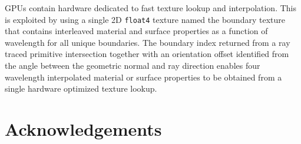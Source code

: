 \documentclass{webofc}
\begin{document}
GPUs contain hardware dedicated to fast texture lookup and interpolation.
This is exploited by using a single 2D {\tt float4} texture named the boundary texture
that contains interleaved material and surface properties as a function of wavelength for all
unique boundaries.
The boundary index returned from a ray traced primitive intersection together with
an orientation offset identified from the angle between the geometric normal and ray direction
enables four wavelength interpolated material or surface properties to be
obtained from a single hardware optimized texture lookup.





\section*{Acknowledgements}
\end{document}
